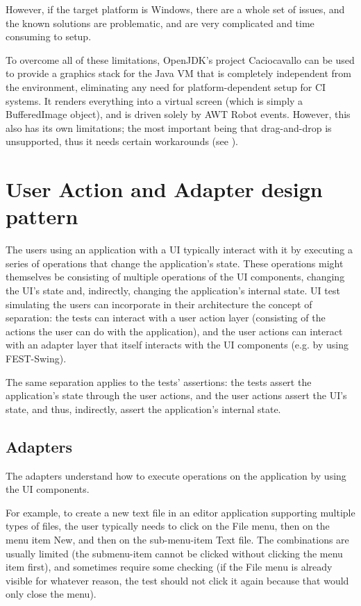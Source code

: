 However, if the target platform is Windows, there are a whole set of issues, and the known solutions are problematic, and are very complicated and time consuming to setup. \cite{HudsonUnderWindows} \cite{Cacio_Tta_FEST}

To overcome all of these limitations, OpenJDK's project Caciocavallo can be used \cite{Cacio_Tta_FEST} to provide a graphics stack for the Java VM that is completely independent from the environment, eliminating any need for platform-dependent setup for CI systems. It renders everything into a virtual screen (which is simply a BufferedImage object), and is driven solely by AWT Robot events. However, this also has its own limitations; the most important being that drag-and-drop \cite{IntroDnD} is unsupported, thus it needs certain workarounds (see ).

\section{User Action and Adapter design pattern}\label{sec:user-actions-adapters}

The users using an application with a UI typically interact with it by executing a series of operations that change the application's state. These operations might themselves be consisting of multiple operations of the UI components, changing the UI's state and, indirectly, changing the application's internal state. UI test simulating the users can incorporate in their architecture the concept of separation: the tests can interact with a user action layer (consisting of the actions the user can do with the application), and the user actions can interact with an adapter layer that itself interacts with the UI components (e.g. by using FEST-Swing).

The same separation applies to the tests' assertions: the tests assert the application's state through the user actions, and the user actions assert the UI's state, and thus, indirectly, assert the application's internal state.

\subsection{Adapters}

The adapters understand how to execute operations on the application by using the UI components. 

For example, to create a new text file in an editor application supporting multiple types of files, the user typically needs to click on the File menu, then on the menu item New, and then on the sub-menu-item Text file. The combinations are usually limited (the submenu-item cannot be clicked without clicking the menu item first), and sometimes require some checking (if the File menu is already visible for whatever reason, the test should not click it again because that would only close the menu).

